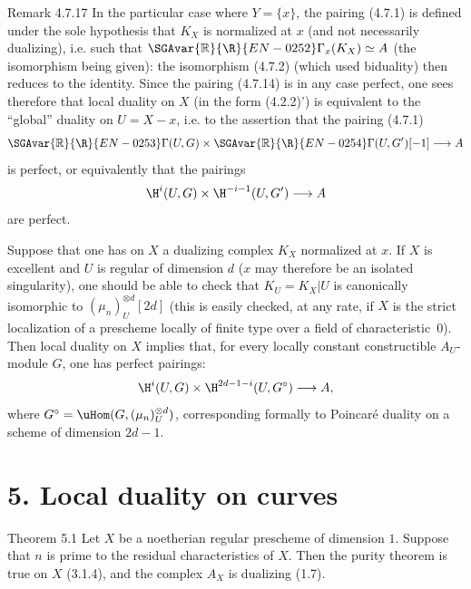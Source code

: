 \begin{statement}{Remark 4.7.17}
In the particular case where $Y=\{x\}$, the pairing (4.7.1) is defined under the sole hypothesis that $K_X$ is normalized at $x$ (and not necessarily dualizing), i.e. such that $\SGAvar{\mathbb{R}}{\R}{EN-0252}\Gamma_x(K_X)\simeq A$ (the isomorphism being given): the isomorphism (4.7.2) (which used biduality) then reduces to the identity. Since the pairing (4.7.14) is in any case perfect, one sees therefore that local duality on $X$ (in the form (4.2.2)') is equivalent to the ``global'' duality on $U=X-x$, i.e. to the assertion that the pairing (4.7.1)
\[
\SGAvar{\mathbb{R}}{\R}{EN-0253}\Gamma(U,G)\times\SGAvar{\mathbb{R}}{\R}{EN-0254}\Gamma(U,G')[-1]\longrightarrow A
\]
is perfect, or equivalently that the pairings
\[
\H^i(U,G)\times\H^{-i-1}(U,G')\longrightarrow A
\]
are perfect.

Suppose that one has on $X$ a dualizing complex $K_X$ normalized at $x$. If $X$ is excellent and $U$ is regular of dimension $d$ ($x$ may therefore be an isolated singularity), one should be able to check that $K_U=K_X|U$ is canonically isomorphic to $(\mu_n)_U^{\otimes d}[2d]$ (this is easily checked, at any rate, if $X$ is the strict localization of a prescheme locally of finite type over a field of characteristic~$0$). Then local duality on $X$ implies that, for every locally constant constructible $A_U$-module $G$, one has perfect pairings:
\[
\H^i(U,G)\times\H^{2d-1-i}(U,G^\circ)\longrightarrow A,
\]
where $G^\circ=\uHom(G,(\mu_n)_U^{\otimes d})$, corresponding formally to Poincaré duality on a scheme of dimension $2d-1$.
\end{statement}

\section*{5. Local duality on curves}

\begin{statement}{Theorem 5.1}
Let $X$ be a noetherian regular prescheme of dimension $1$. Suppose that $n$ is prime to the residual characteristics of $X$. Then the purity theorem is true on $X$ (3.1.4), and the complex $A_X$ is dualizing (1.7).
\end{statement}

